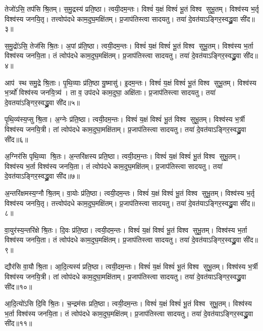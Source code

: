    तेजो॑ऽसि॒ तप॑सि श्रि॒तम्।
   स॒मु॒द्रस्य॑ प्रति॒ष्ठा।
   त्वयी॒दम॒न्तः।
   विश्वं॑ य॒क्षं विश्वं॑ भू॒तं विश्व सुभू॒तम्।
   विश्व॑स्य भ॒र्तृ विश्व॑स्य जनयि॒तृ।
   तत्त्वोप॑दधे काम॒दुघ॒मक्षि॑तम्।
   प्र॒जाप॑तिस्त्वा सादयतु।
   तया॑ दे॒वत॑याऽङ्गिर॒स्वद्ध्रु॒वा सी॑द॥३॥

   स॒मु॒द्रो॑ऽसि॒ तेज॑सि श्रि॒तः।
   अ॒पां प्र॑ति॒ष्ठा।
   त्वयी॒दम॒न्तः।
   विश्वं॑ य॒क्षं विश्वं॑ भू॒तं विश्व सुभू॒तम्।
   विश्व॑स्य भ॒र्ता विश्व॑स्य जनयि॒ता।
   तं त्वोप॑दधे काम॒दुघ॒मक्षि॑तम्।
   प्र॒जाप॑तिस्त्वा सादयतु।
   तया॑ दे॒वत॑याऽङ्गिर॒स्वद्ध्रु॒वा सी॑द॥४॥

   आप॑ स्थ समु॒द्रे श्रि॒ताः।
   पृ॒थि॒व्याः प्र॑ति॒ष्ठा यु॒ष्मासु॑।
   इ॒दम॒न्तः।
   विश्वं॑ य॒क्षं विश्वं॑ भू॒तं विश्व सुभू॒तम्।
   विश्व॑स्य भ॒र्त्र्यो॑ विश्व॑स्य जनयि॒त्र्य॑।
   ता व॒ उप॑दधे काम॒दुघा॒ अक्षि॑ताः।
   प्र॒जाप॑तिस्त्वा सादयतु।
   तया॑ दे॒वतया॑ऽङ्गिर॒स्वद्ध्रु॒वा सी॑द॥५॥

   पृ॒थि॒व्य॑स्य॒प्सु श्रि॒ता।
   अ॒ग्नेः प्र॑ति॒ष्ठा।
   त्वयी॒दम॒न्तः।
   विश्वं॑ य॒क्षं विश्वं॑ भू॒तं विश्व सुभू॒तम्।
   विश्व॑स्य भ॒र्त्री विश्व॑स्य जनयि॒त्री।
   तां त्वोप॑दधे काम॒दुघा॒मक्षि॑ताम्।
   प्र॒जाप॑तिस्त्वा सादयतु।
   तया॑ दे॒वत॑याऽङ्गिर॒स्वद्ध्रु॒वा सी॑द॥६॥

   अ॒ग्निर॑सि पृथि॒व्या श्रि॒तः।
   अ॒न्तरि॑क्षस्य प्रति॒ष्ठा।
   त्वयी॒दम॒न्तः।
   विश्वं॑ य॒क्षं विश्वं॑ भू॒तं विश्व सुभू॒तम्।
   विश्व॑स्य भ॒र्ता विश्व॑स्य जनयि॒ता।
   तं त्वोप॑दधे काम॒दुघ॒मक्षि॑तम्।
   प्र॒जाप॑तिस्त्वा सादयतु।
   तया॑ दे॒वत॑याऽङ्गिर॒स्वद्ध्रु॒वा सी॑द॥७॥

   अ॒न्तरि॑क्षमस्य॒ग्नौ श्रि॒तम्।
   वा॒योः प्र॑ति॒ष्ठा।
   त्वयी॒दम॒न्तः।
   विश्वं॑ य॒क्षं विश्वं॑ भू॒तं विश्व सुभू॒तम्।
   विश्व॑स्य भ॒र्तृ विश्व॑स्य जनयि॒तृ।
   तत्त्वोप॑दधे काम॒दुघ॒मक्षि॑तम्।
   प्र॒जाप॑तिस्त्वा सादयतु।
   तया॑ दे॒वत॑याऽङ्गिर॒स्वद्ध्रु॒वा सी॑द॥८॥

   वा॒युर॑स्य॒न्तरि॑क्षे श्रि॒तः।
   दि॒वः प्र॑ति॒ष्ठा।
   त्वयी॒दम॒न्तः।
   विश्वं॑ य॒क्षं विश्वं॑ भू॒तं विश्व सुभू॒तम्।
   विश्व॑स्य भ॒र्ता विश्व॑स्य जनयि॒ता।
   तं त्वोप॑दधे काम॒दुघ॒मक्षि॑तम्।
   प्र॒जाप॑तिस्त्वा सादयतु।
   तया॑ दे॒वत॑याऽङ्गिर॒स्वद्ध्रु॒वा सी॑द॥९॥

   द्यौर॑सि वा॒यौ श्रि॒ता।
   आ॒दि॒त्यस्य॑ प्रति॒ष्ठा।
   त्वयी॒दम॒न्तः।
   विश्वं॑ य॒क्षं विश्वं॑ भू॒तं विश्व सुभू॒तम्।
   विश्व॑स्य भ॒र्त्री विश्व॑स्य जनयि॒त्री।
   तां त्वोप॑दधे काम॒दुघा॒मक्षि॑ताम्।
   प्र॒जाप॑तिस्त्वा सादयतु।
   तया॑ दे॒वत॑याऽङ्गिर॒स्वद्ध्रु॒वा सी॑द॥१०॥

   आ॒दि॒त्यो॑ऽसि दि॒वि श्रि॒तः।
   च॒न्द्रम॑सः प्रति॒ष्ठा।
   त्वयी॒दम॒न्तः।
   विश्वं॑ य॒क्षं विश्वं॑ भू॒तं विश्व सुभू॒तम्।
   विश्व॑स्य भ॒र्ता विश्व॑स्य जनयि॒ता।
   तं त्वोप॑दधे काम॒दुघ॒मक्षि॑तम्।
   प्र॒जाप॑तिस्त्वा सादयतु।
   तया॑ दे॒वत॑याऽङ्गिर॒स्वद्ध्रु॒वा सी॑द॥११॥

